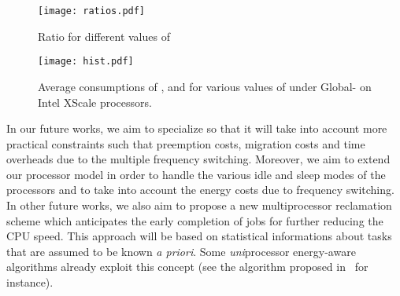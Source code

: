 \documentclass[times, 10pt,twocolumn]{article}
\begin{document}
\begin{figure}[h!]
\begin{center}
\texttt{[image: ratios.pdf]}
\label{fig:ratios}
\vspace{-5ex}
\caption{Ratio  for different values of }
\vspace{-3ex}
\end{center}
\end{figure}

\begin{figure}[h!]
\begin{center}
\texttt{[image: hist.pdf]}
\label{fig:hist}
\vspace{-5ex}
\caption{Average consumptions of ,  and  for various values of  under Global- on Intel XScale processors.}
\end{center}
\end{figure}

In our future works, we aim to specialize  so that it will take into account more practical constraints such that preemption costs, migration costs and time overheads due to the multiple frequency switching. Moreover, we aim to extend our processor model in order to handle the various idle and sleep modes of the processors and to take into account the energy costs due to frequency switching. In other future works, we also aim to propose a new multiprocessor reclamation scheme which anticipates the early completion of jobs for further reducing the CPU speed. This approach will be based on statistical informations about tasks that are assumed to be known \emph{a priori}. Some \emph{uni}processor energy-aware algorithms already exploit this concept (see the  algorithm proposed in~\cite{AyMeMoMe:04} for instance).



\end{document}
